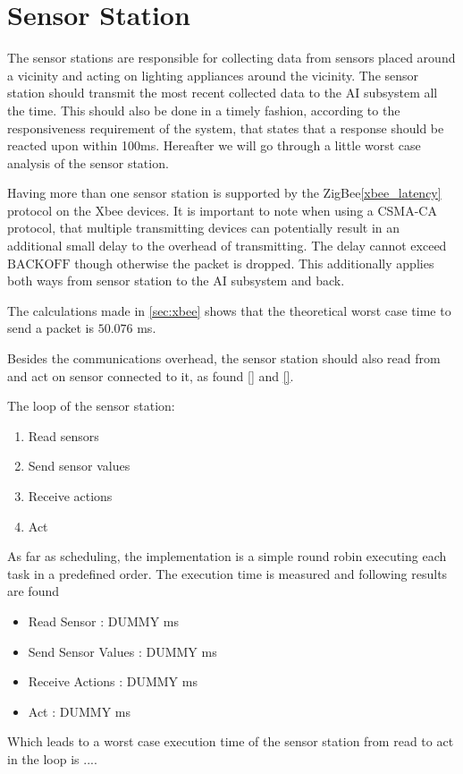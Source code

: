 \section{Sensor Station}\label{sub:sensorStation}

The sensor stations are responsible for collecting data from sensors placed around a vicinity and acting on lighting appliances around the vicinity. The sensor station should transmit the most recent collected data to the AI subsystem all the time. This should also be done in a timely fashion, according to the responsiveness requirement of the system, that states that a response should be reacted upon within 100ms. Hereafter we will go through a little worst case analysis of the sensor station.

Having more than one sensor station is supported by the ZigBee\cref{xbee_latency} protocol on the Xbee devices. It is important to note when using a CSMA-CA protocol, that multiple transmitting devices can potentially result in an additional small delay to the overhead of transmitting. The delay cannot exceed $\text{BACKOFF}$ though otherwise the packet is dropped. This additionally applies both ways from sensor station to the AI subsystem and back.

The calculations made in \cref{sec:xbee} shows that the theoretical worst case time to send a packet is $50.076$ ms.

Besides the communications overhead, the sensor station should also read from and act on sensor connected to it,  as found \cref{} and \cref{}.

The loop of the sensor station:
\begin{enumerate}
  \item Read sensors
  \item Send sensor values
  \item Receive actions
  \item Act
\end{enumerate}

As far as scheduling, the implementation is a simple round robin executing each task in a predefined order. The execution time is measured and following results are found
 \begin{itemize}
  \item Read Sensor : DUMMY ms
  \item Send Sensor Values : DUMMY ms
  \item Receive Actions : DUMMY ms
  \item Act : DUMMY ms 
\end{itemize}

Which leads to a worst case execution time of the sensor station from read to act in the loop is .... 
